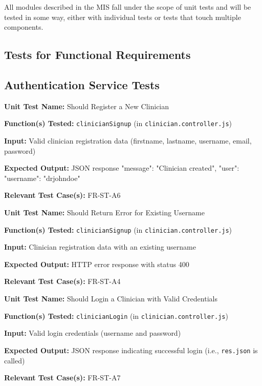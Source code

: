\documentclass[12pt, titlepage]{article}
\begin{document}
All modules described in the MIS fall under the scope of unit tests and will be tested in some way, either with individual tests or tests that touch multiple components.

\subsection{Tests for Functional Requirements}

\subsection*{Authentication Service Tests}

\begin{mdframed}[linewidth=0.5mm]
\textbf{Unit Test Name:} Should Register a New Clinician \par
\textbf{Function(s) Tested:} \texttt{clinicianSignup} (in \texttt{clinician.controller.js}) \par
\textbf{Input:} Valid clinician registration data (firstname, lastname, username, email, password) \par
\textbf{Expected Output:} JSON response {"message": "Clinician created", "user": {"username": "drjohndoe"}} \par
\textbf{Relevant Test Case(s):} FR-ST-A6
\end{mdframed}

\begin{mdframed}[linewidth=0.5mm]
\textbf{Unit Test Name:} Should Return Error for Existing Username \par
\textbf{Function(s) Tested:} \texttt{clinicianSignup} (in \texttt{clinician.controller.js}) \par
\textbf{Input:} Clinician registration data with an existing username \par
\textbf{Expected Output:} HTTP error response with status 400 \par
\textbf{Relevant Test Case(s):} FR-ST-A4
\end{mdframed}

\begin{mdframed}[linewidth=0.5mm]
\textbf{Unit Test Name:} Should Login a Clinician with Valid Credentials \par
\textbf{Function(s) Tested:} \texttt{clinicianLogin} (in \texttt{clinician.controller.js}) \par
\textbf{Input:} Valid login credentials (username and password) \par
\textbf{Expected Output:} JSON response indicating successful login (i.e., \texttt{res.json} is called) \par
\textbf{Relevant Test Case(s):} FR-ST-A7
\end{mdframed}
\end{document}

